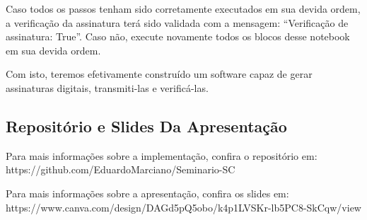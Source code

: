 \documentclass[11pt]{article}
\begin{document}
    Caso todos os passos tenham sido corretamente executados em sua devida
ordem, a verificação da assinatura terá sido validada com a mensagem:
``Verificação de assinatura: True''. Caso não, execute novamente todos
os blocos desse notebook em sua devida ordem.

Com isto, teremos efetivamente construído um software capaz de gerar
assinaturas digitais, transmiti-las e verificá-las.

    \hypertarget{reposituxf3rio-e-slides-da-apresentauxe7uxe3o}{%
\subsection{Repositório e Slides Da
Apresentação}\label{reposituxf3rio-e-slides-da-apresentauxe7uxe3o}}

Para mais informações sobre a implementação, confira o repositório em:
https://github.com/EduardoMarciano/Seminario-SC

Para mais informações sobre a apresentação, confira os slides em:
https://www.canva.com/design/DAGd5pQ5obo/k4p1LVSKr-lb5PC8-SkCqw/view


    
    
    
\end{document}
